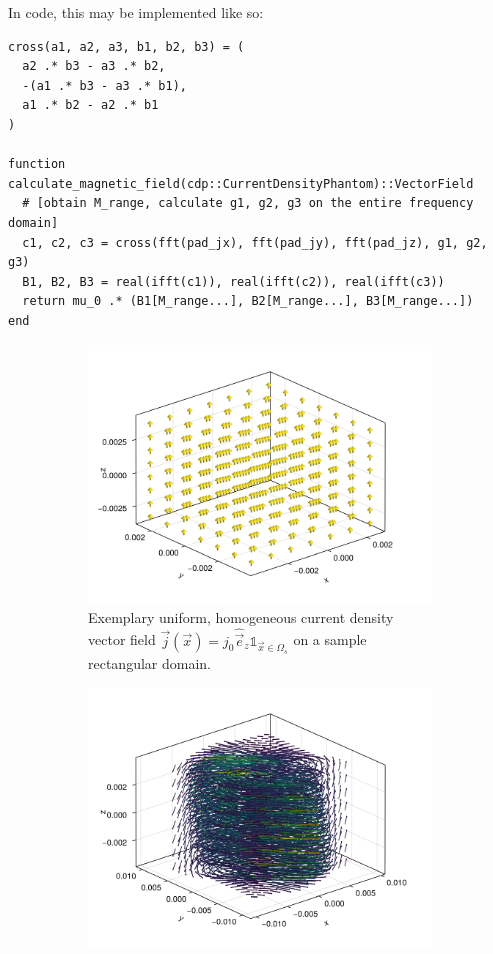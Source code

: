 \documentclass[12pt]{article}
\begin{document}
  In code, this may be implemented like so:
  \begin{verbatim}
cross(a1, a2, a3, b1, b2, b3) = (
  a2 .* b3 - a3 .* b2,
  -(a1 .* b3 - a3 .* b1),
  a1 .* b2 - a2 .* b1
)

function calculate_magnetic_field(cdp::CurrentDensityPhantom)::VectorField
  # [obtain M_range, calculate g1, g2, g3 on the entire frequency domain]
  c1, c2, c3 = cross(fft(pad_jx), fft(pad_jy), fft(pad_jz), g1, g2, g3)
  B1, B2, B3 = real(ifft(c1)), real(ifft(c2)), real(ifft(c3))
  return mu_0 .* (B1[M_range...], B2[M_range...], B3[M_range...])
end
  \end{verbatim}

  \begin{figure}[H]
    \centering
    \begin{subfigure}[t]{0.48\textwidth}
      \centering
      \includegraphics[width=\textwidth]{../figures/demo-cdp-j-field.pdf}
      \caption{Exemplary uniform, homogeneous current density vector field $\vec{j}(\vec{x}) = {j}_0 \hat{\vec{e}}_z \mathds{1}_{\vec{x} \in \Omega_s}$ on a sample rectangular domain.}
      \label{fig:demo-cdp-j-field}
    \end{subfigure}
    \hfill
    \begin{subfigure}[t]{0.48\textwidth}
      \centering
      \includegraphics[width=\textwidth]{../figures/demo-cdp-b-field.pdf}

\end{subfigure}
\end{figure}
\end{document}
